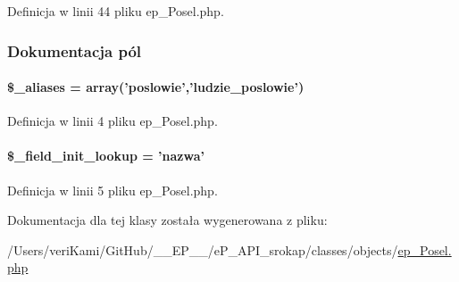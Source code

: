 Definicja w linii 44 pliku ep\-\_\-\-Posel.\-php.



\subsubsection{Dokumentacja pól}
\hypertarget{classep___posel_ab4e31d75f0bc5d512456911e5d01366b}{
\paragraph[{\$\-\_\-aliases}]{\setlength{\rightskip}{0pt plus 5cm}\$\-\_\-aliases = array('poslowie','ludzie\-\_\-poslowie')}}\label{classep___posel_ab4e31d75f0bc5d512456911e5d01366b}


Definicja w linii 4 pliku ep\-\_\-\-Posel.\-php.

\hypertarget{classep___posel_a4a4d54ae35428077a7c61ec8a5139af3}{
\paragraph[{\$\-\_\-field\-\_\-init\-\_\-lookup}]{\setlength{\rightskip}{0pt plus 5cm}\$\-\_\-field\-\_\-init\-\_\-lookup = 'nazwa'}}\label{classep___posel_a4a4d54ae35428077a7c61ec8a5139af3}


Definicja w linii 5 pliku ep\-\_\-\-Posel.\-php.



Dokumentacja dla tej klasy została wygenerowana z pliku\-:\begin{DoxyCompactItemize}
\item 
/\-Users/veri\-Kami/\-Git\-Hub/\-\_\-\-\_\-\-E\-P\-\_\-\-\_\-/e\-P\-\_\-\-A\-P\-I\-\_\-srokap/classes/objects/\hyperlink{ep___posel_8php}{ep\-\_\-\-Posel.\-php}\end{DoxyCompactItemize}
